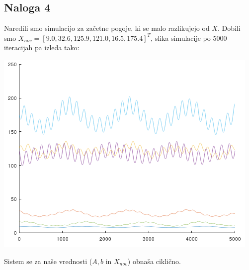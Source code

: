 \documentclass[a4paper, 12pt]{article}
\begin{document}
\subsection{Naloga 4}
Naredili smo simulacijo za začetne pogoje, ki se malo razlikujejo od $ X $. Dobili smo
$ X_{nov} = \left[9.0, 32.6, 125.9, 121.0, 16.5, 175.4\right]^{T} $, slika simulacije po 5000 iteracijah
pa izleda tako:\\
\begin{center}
	\includegraphics{stationary_almost.png}
\end{center}
Sistem se za naše vrednosti ($ A, b $ in $ X_{nov} $) obnaša ciklično.
\end{document}
